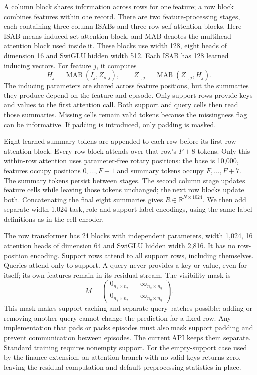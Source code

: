 \documentclass[11pt]{article}
\begin{document}
A column block shares information across rows for one feature; a row block combines features within one record. There are two feature-processing stages, each containing three column ISABs and three row self-attention blocks. Here ISAB means induced set-attention block, and MAB denotes the multihead attention block used inside it. These blocks use width 128, eight heads of dimension 16 and SwiGLU hidden width 512. Each ISAB has 128 learned inducing vectors. For feature $j$, it computes
\[
 H_j=\operatorname{MAB}(I_j,Z_{s,j}),\qquad
 Z_{:,j}=\operatorname{MAB}(Z_{:,j},H_j).
\]
The inducing parameters are shared across feature positions, but the summaries they produce depend on the feature and episode. Only support rows provide keys and values to the first attention call. Both support and query cells then read those summaries. Missing cells remain valid tokens because the missingness flag can be informative. If padding is introduced, only padding is masked.

Eight learned summary tokens are appended to each row before its first row-attention block. Every row block attends over that row's $F+8$ tokens. Only this within-row attention uses parameter-free rotary positions: the base is 10,000, features occupy positions $0,\ldots,F-1$ and summary tokens occupy $F,\ldots,F+7$. The summary tokens persist between stages. The second column stage updates feature cells while leaving those tokens unchanged; the next row blocks update both. Concatenating the final eight summaries gives $R\in\mathbb R^{N\times1024}$. We then add separate width-1,024 task, role and support-label encodings, using the same label definitions as in the cell encoder.

The row transformer has 24 blocks with independent parameters, width 1,024, 16 attention heads of dimension 64 and SwiGLU hidden width 2,816. It has no row-position encoding. Support rows attend to all support rows, including themselves. Queries attend only to support. A query never provides a key or value, even for itself; its own features remain in its residual stream. The visibility mask is
\[
 M=\begin{pmatrix}0_{n_s\times n_s}&-\infty_{n_s\times n_q}\\
 0_{n_q\times n_s}&-\infty_{n_q\times n_q}\end{pmatrix}.
\]
This mask makes support caching and separate query batches possible: adding or removing another query cannot change the prediction for a fixed row. Any implementation that pads or packs episodes must also mask support padding and prevent communication between episodes. The current API keeps them separate. Standard training requires nonempty support. For the empty-support case used by the finance extension, an attention branch with no valid keys returns zero, leaving the residual computation and default preprocessing statistics in place.
\end{document}
